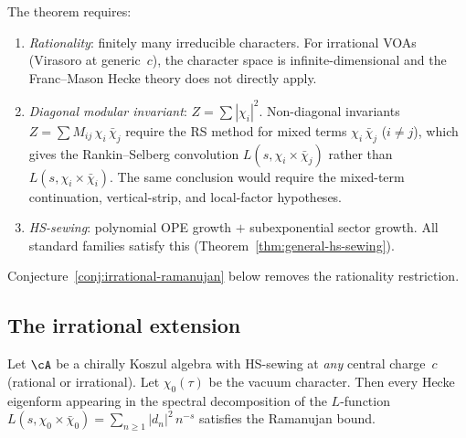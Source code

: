 \begin{remark}[Hypotheses]%
\label{rem:non-lattice-gap}%
%
The theorem requires:
\begin{enumerate}[label=\textup{(\alph*)}]
\item \emph{Rationality}: finitely many irreducible
 characters. For irrational VOAs (Virasoro at
 generic~$c$), the character space is infinite-dimensional
 and the Franc--Mason Hecke theory does not directly apply.
\item \emph{Diagonal modular invariant}:
 $Z = \sum|\chi_i|^2$. Non-diagonal invariants
 $Z = \sum M_{ij}\,\chi_i\,\bar\chi_j$ require
 the RS method for mixed terms $\chi_i\,\bar\chi_j$
 ($i \ne j$), which gives the Rankin--Selberg
 convolution $L(s, \chi_i \times \bar\chi_j)$ rather than
 $L(s, \chi_i \times \bar\chi_i)$. The same conclusion would
 require the mixed-term continuation, vertical-strip, and
 local-factor hypotheses.
\item \emph{HS-sewing}: polynomial OPE growth $+$
 subexponential sector growth. All standard families
 satisfy this
 (Theorem~\ref{thm:general-hs-sewing}).
\end{enumerate}
Conjecture~\ref{conj:irrational-ramanujan} below removes the
rationality restriction.
\end{remark}

\subsection{The irrational extension}%
\label{sec:irrational-extension}%

\begin{conjecture}%
\label{conj:irrational-ramanujan}%
\ClaimStatusConjectured%
%
%
Let $\cA$ be a chirally Koszul algebra with HS-sewing at
\emph{any} central charge~$c$ \textup{(}rational or
irrational\textup{)}. Let $\chi_0(\tau)$ be the vacuum
character. Then every Hecke eigenform appearing in the
spectral decomposition of the $L$-function
$L(s, \chi_0 \times \bar\chi_0)
= \sum_{n \ge 1} |d_n|^2\,n^{-s}$ satisfies
the Ramanujan bound.
\end{conjecture}


